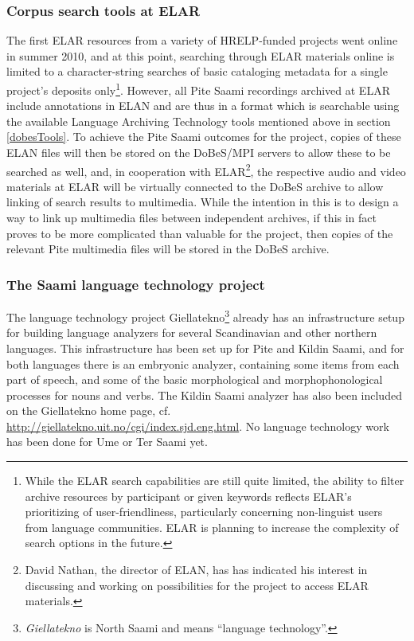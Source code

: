 \documentclass[a4paper,12pt]{article}
\begin{document}
\subsubsection{Corpus search tools at ELAR}\label{elarTools}
The first ELAR resources from a variety of HRELP-funded projects went online in summer 2010, and at this point, searching through ELAR materials online is limited to a character-string searches of basic cataloging metadata for a single project's deposits only\footnote{While the ELAR search capabilities are still quite limited, the ability to filter archive resources by participant or given keywords reflects ELAR's prioritizing of user-friendliness, particularly concerning non-linguist users from language communities. ELAR is planning to increase the complexity of search options in the future.}. However, all Pite Saami recordings archived at ELAR include annotations in ELAN and are thus in a format which is searchable using the available Language Archiving Technology tools mentioned above in section \ref{dobesTools}. To achieve the Pite Saami outcomes for the project, copies of these ELAN files will then be stored on the DoBeS/MPI servers to allow these to be searched as well, and, in cooperation with ELAR\footnote{David Nathan, the director of ELAN, has has indicated his interest in discussing and working on possibilities for the project to access ELAR materials.}, the respective audio and video materials at ELAR will be virtually connected to the DoBeS archive to allow linking of search results to multimedia. While the intention in this is to design a way to link up multimedia files between independent archives, if this in fact proves to be more complicated than valuable for the project, then copies of the relevant Pite multimedia files will be stored in the DoBeS archive.

\subsubsection{The Saami language technology project}

The language technology project Giellatekno\footnote{\textit{Giellatekno} is North Saami and means “language technology”.} already has an infrastructure setup for building language analyzers for several Scandinavian and other northern languages. This infrastructure has been set up for Pite and Kildin Saami, and for both languages there is an embryonic analyzer, containing some items from each part of speech, and some of the basic morphological and morphophonological processes for nouns and verbs. The Kildin Saami analyzer has also been included on the Giellatekno home page, cf. \url{http://giellatekno.uit.no/cgi/index.sjd.eng.html}.  No language technology work has been done for Ume or Ter Saami yet.
\end{document}
